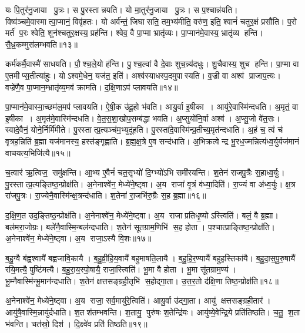 यः पि॒तुर॑नु॒जाया पु॒त्रः।
स पु॒रस्तान्नयति।
यो मा॒तुर॑नु॒जाया पु॒त्रः।
स प॒श्चान्न॑यति।
विष्व॑ञ्चमे॒वास्मात्पा॒प्मानं॒ विवृ॑हतः।
यो अर्व॑न्तं॒ जिघासति॒ तम॒भ्य॑मीति॒ वरु॑ण॒ इति॒ श्वानं॑ चतुर॒क्षं प्रसौ॑ति।
प॒रो मर्त॑ प॒रः श्वेति॒ शुन॑श्चतुर॒क्षस्य॒ प्रह॑न्ति।
श्वेव॒ वै पा॒प्मा भ्रातृ॑व्यः।
पा॒प्मान॑मे॒वास्य॒ भ्रातृ॑व्य हन्ति।
सै॒ध्र॒कम्मुस॑लम्भवति॥१३॥

कर्म॑कर्मै॒वास्मै॑ साधयति।
पौ॒श्च॒ले॒यो ह॑न्ति।
पु॒श्च॒ल्वां वै दे॒वाः शुच॒न्न्य॑दधुः।
शु॒चैवास्य॒ शुच हन्ति।
पा॒प्मा वा ए॒तमीप्स॒तीत्या॑हुः।
योऽश्वमे॒धेन॒ यज॑त॒ इति॑।
अश्व॑स्याधस्प॒दमुपास्यति।
व॒ज्री वा अश्व॑ प्राजाप॒त्यः।
वज्रे॑णै॒व पा॒प्मान॒म्भ्रातृ॑व्य॒मव॑ क्रामति।
द॒क्षि॒णाऽप॑ प्लावयति॥१४॥

पा॒प्मान॑मे॒वास्मा॒च्छम॑ल॒मप॑ प्लावयति।
ऐ॒षी॒क उ॑दू॒हो भ॑वति।
आयु॒र्वा इ॒षीका।
आयु॑रे॒वास्मि॑न्दधति।
अ॒मृतं॒ वा इ॒षीका।
अ॒मृत॑मे॒वास्मि॑न्दधति।
वे॒त॒स॒शा॒खोप॒सम्ब॑द्धा भवति।
अ॒प्सुयो॑नि॒र्वा अश्व॑।
अ॒प्सु॒जो वे॑त॒सः।
स्वादे॒वैनं॒ योने॒र्निर्मि॑मीते।
पु॒रस्तात्प्र॒त्यञ्च॑म॒भ्युदू॑हति।
पु॒रस्ता॑दे॒वास्मि॑न्प्र॒तीच्य॒मृत॑न्दधाति।
अ॒हं च॒ त्वं च॑ वृत्रह॒न्निति॑ ब्र॒ह्मा यज॑मानस्य॒ हस्त॑ङ्गृह्णाति।
ब्र॒ह्म॒क्ष॒त्रे ए॒व सन्द॑धाति।
अ॒भिक्रत्वेन्द्र भू॒रध॒ज्मन्नित्य॑ध्व॒र्युर्यज॑मानं वाचयत्य॒भिजि॑त्यै॥१५॥\anuvakamend[भ॒व॒ति॒ प्ला॒व॒य॒ति॒ मि॒मी॒ते॒ पञ्च॑ च]

च॒त्वार॑ ऋ॒त्विज॒ समु॑क्षन्ति।
आ॒भ्य ए॒वैनं॑ चत॒सृभ्यो॑ दि॒ग्भ्यो॑ऽभि समी॑रयन्ति।
श॒तेन॑ राजपु॒त्रैः स॒हाध्व॒र्युः।
पु॒रस्तात्प्र॒त्यङ्तिष्ठ॒न्प्रोक्ष॑ति।
अ॒नेनाश्वे॑न॒ मेध्ये॑ने॒ष्ट्वा।
अ॒य राजा॑ वृ॒त्रं व॑ध्या॒दिति॑।
रा॒ज्यं वा अ॑ध्व॒र्युः।
क्ष॒त्र रा॑जपु॒त्रः।
रा॒ज्येनै॒वास्मि॑न्क्ष॒त्रन्द॑धाति।
श॒तेना॑ रा॒जभि॑रु॒ग्रैः स॒ह ब्र॒ह्मा॥१६॥

द॒क्षि॒ण॒त उद॒ङ्तिष्ठ॒न्प्रोक्ष॑ति।
अ॒नेनाश्वे॑न॒ मेध्ये॑ने॒ष्ट्वा।
अ॒य राजाप्रतिधृ॒ष्योऽस्त्विति॑।
बलं॒ वै ब्र॒ह्मा।
बल॑मरा॒जोग्रः।
बले॑नै॒वास्मि॒न्बल॑न्दधाति।
श॒तेन॑ सूतग्राम॒णिभि॑ स॒ह होता।
प॒श्चात्प्राङ्तिष्ठ॒न्प्रोक्ष॑ति।
अ॒नेनाश्वे॑न॒ मेध्ये॑ने॒ष्ट्वा।
अ॒य राजा॒ऽस्यै वि॒शः॥१७॥

ब॒हु॒ग्वै ब॑ह्व॒श्वायै॑ बह्वजावि॒कायै।
ब॒हु॒व्री॒हि॒य॒वायै॑ बहुमाषति॒लायै।
ब॒हु॒हि॒र॒ण्यायै॑ बहुह॒स्तिका॑यै।
ब॒हु॒दा॒स॒पू॒रु॒षायै॑ रयि॒मत्यै॒ पुष्टि॑मत्यै।
ब॒हु॒रा॒य॒स्पो॒षायै॒ राजा॒स्त्विति॑।
भू॒मा वै होता।
भू॒मा सू॑तग्राम॒ण्य॑।
भू॒म्नैवास्मि॑न्भू॒मान॑न्दधाति।
श॒तेन॑ क्षत्तसङ्ग्रही॒तृभि॑ स॒होद्गा॒ता।
उ॒त्त॒र॒तो द॑क्षि॒णा तिष्ठ॒न्प्रोक्ष॑ति॥१८॥

अ॒नेनाश्वे॑न॒ मेध्ये॑ने॒ष्ट्वा।
अ॒य राजा॒ सर्व॒मायु॑रे॒त्विति॑।
आयु॒र्वा उ॑द्गा॒ता।
आयु॑ क्षत्तसङ्ग्रही॒तार॑।
आयु॑षै॒वास्मि॒न्नायु॑र्दधाति।
श॒तश॑तम्भवन्ति।
श॒तायु॒ पुरु॑षः श॒तेन्द्रि॑यः।
आयु॑ष्ये॒वेन्द्रि॒ये प्रति॑तिष्ठति।
च॒तु॒ श॒ता भ॑वन्ति।
चत॑स्रो॒ दिश॑।
दि॒क्ष्वे॑व प्रति॑ तिष्ठति॥१९॥\anuvakamend[ब्र॒ह्मा वि॒श उ॑क्षति॒ दिश॒ एकं च]

